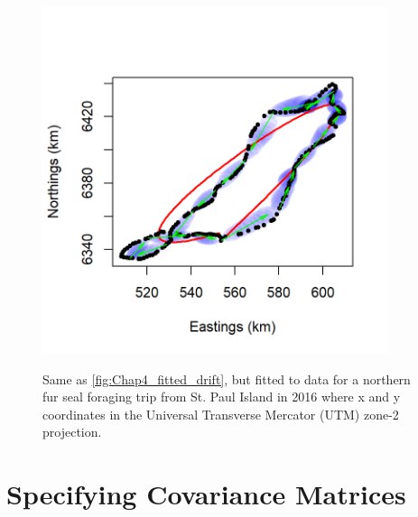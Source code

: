 \begin{figure}[!ht]
    \caption[Reconstructed track and drift using northern fur seal data]{Same as \ref{fig:Chap4_fitted_drift}, but fitted to data for a northern fur seal foraging trip from St. Paul Island in 2016 where x and y coordinates in the Universal Transverse Mercator (UTM) zone-2 projection.}
    \centering
    \includegraphics[width=4in]{Chap_4/fitted_NFS.png}
    \label{fig:Chap4_NFS}
\end{figure}

\section{Specifying Covariance Matrices} \label{eq:Chap4_covariance_matrices}


